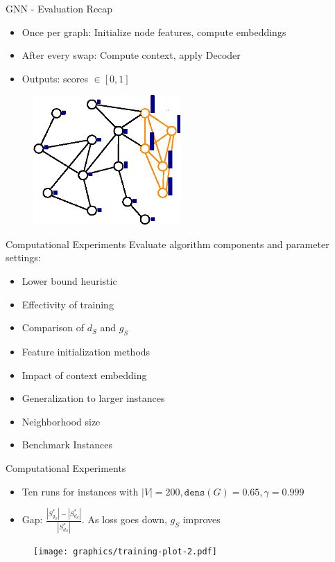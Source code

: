 \documentclass{beamer}
\begin{document}
\begin{frame}{GNN - Evaluation Recap}
    \begin{itemize}
        \item<1-> Once per graph: Initialize node features, compute embeddings
        \item<2-> After every swap: Compute context, apply Decoder
        \item<3-> Outputs: scores $\in [0,1]$
    \end{itemize}
    \begin{figure}
        \centering
        \includegraphics[width=0.5\textwidth]{graphics/algorithm_poster_5.eps}
    \end{figure}
\end{frame}

\begin{frame}{Computational Experiments}
    Evaluate algorithm components and parameter settings:
    \begin{itemize}
        \item<1-> Lower bound heuristic
        \item<2-> Effectivity of training
        \item<3-> Comparison of $d_S$ and $g_S$
        \item<4-> Feature initialization methods
        \item<5-> Impact of context embedding
        \item<6-> Generalization to larger instances
        \item<7-> Neighborhood size
        \item<8-> Benchmark Instances
    \end{itemize} 
\end{frame}

\begin{frame}{Computational Experiments}
    \begin{itemize}
        \item Ten runs for instances with $|V| = 200, \mathtt{dens}(G) = 0.65, \gamma=0.999$
        \item Gap: $\frac{|S^*_{g_S}| - |S^*_{d_S}|}{|S^*_{d_S}|}$. As loss goes down, $g_S$ improves
    \end{itemize} 
    \begin{figure}
        \centering
        \texttt{[image: graphics/training-plot-2.pdf]}
    \end{figure}
\end{frame}
\end{document}

